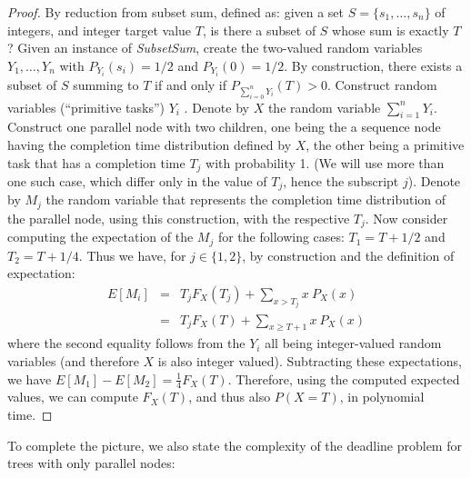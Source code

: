 \documentclass[review]{elsarticle}
\begin{document}
\begin{proof}
By reduction from subset sum, defined as:
given a set $S=\{s_{1},\dots,s_{n}\}$ of integers, and integer target value $T$, is there a subset of $S$ whose sum is exactly $T$? 
Given an instance of \textit{SubsetSum}, create
the two-valued random variables  $Y_{1},\dots,Y_{n} $ with $P_{Y_i}(s_i)=1/2$ and $P_{Y_i}(0)=1/2$. 
By construction, there exists a subset of $S$ summing 
to $T$ if and only if $P_{\sum_{i=0}^{n} Y_{i}}(T)>0$.
Construct random variables  (``primitive tasks'') $Y_i$ .
Denote by $X$ the random variable $\sum_{i=1}^{n} Y_{i}$. Construct one parallel node
with two children, one being the a sequence node having the
completion time distribution
defined by $X$, the other being a primitive task that has a completion time
$T_j$ with probability 1. (We will use more than one such case,
which differ only in the value of $T_j$, hence the subscript $j$).
Denote by $M_j$ the random variable that represents the completion time
distribution of the parallel node, using this
construction, with the respective $T_j$. Now consider computing the
expectation of the $M_j$ for the following cases: $T_1 = T+{1}/{2}$
and $T_2 = T+{1}/{4}$.
Thus we have, for $j\in\{ 1, 2\}$, by construction and the definition of
expectation:
{
\begin{eqnarray*}
E[M_i] &=& T_j F_{X}( T_j) + \sum_{x > T_j} x~P_{X}(x)  \\
          &=& T_j F_{X}( T)+ \sum_{x \geq T+1} x~P_{X}(x)
\end{eqnarray*}}
where the second equality follows from the $Y_i$ all being
integer-valued random variables  (and therefore $X$ is also integer valued).
Subtracting these expectations, we have $E[M_1]-E[M_2]=\frac{1}{4}F_{X}( T)$.
Therefore, using the computed expected values, we can compute
$F_{X}( T)$, and thus also $P(X=T)$, in polynomial time.
\end{proof}

To complete the picture, we also state the complexity of the deadline problem  for trees with only parallel nodes:
\end{document}
